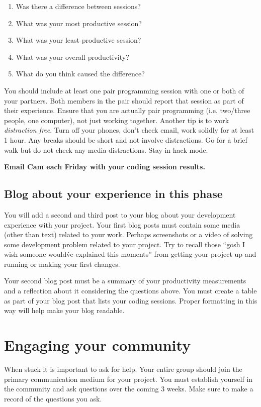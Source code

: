\documentclass[letterpaper]{article}
\begin{document}
\begin{enumerate}
	\item Was there a difference between sessions?
	\item What was your most productive session?
	\item What was your least productive session?
	\item What was your overall productivity?
	\item What do you think caused the difference?
\end{enumerate}

You should include at least one pair programming session with one or both of your partners.  Both members in the pair should report that session as part of their experience.  Ensure that you are actually pair programming (i.e. two/three people, one computer), not just working together.  Another tip is to work {\em distraction free}.  Turn off your phones, don't check email, work solidly for at least 1 hour.  Any breaks should be short and not involve distractions.  Go for a brief walk but do not check any media distractions.  Stay in hack mode.

{\bf Email Cam each Friday with your coding session results.}

\subsection{Blog about your experience in this phase}

You will add a second and third post to your blog about your development experience with your project.
Your first blog posts must contain some media (other than text) related to your work.  Perhaps screenshots or a video of solving some development problem related to your project.  Try to recall those ``gosh I wish someone would\'ve explained this moments'' from getting your project up and running or making your first changes.

Your second blog post must be a summary of your productivity measurements and a reflection about it considering the questions above.  You must create a table as part of your blog post that lists your 
coding sessions.  Proper formatting in this way will help make your blog readable.

\section{Engaging your community}

When stuck it is important to ask for help. Your entire group should join the primary communication
medium for your project. You must establish yourself in the community and ask questions over the
coming 3 weeks.  Make sure to make a record of the questions you ask.
\end{document}
